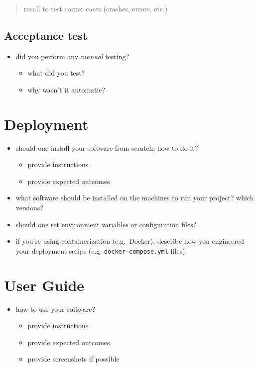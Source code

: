 \documentclass{scrartcl}
\begin{document}
\begin{quote}
recall to test corner cases (crashes, errors, etc.)
\end{quote}

\subsection{Acceptance test}\label{acceptance-test}

\begin{itemize}
  \item did you perform any \emph{manual} testing?
  \begin{itemize}
    \item what did you test?
    \item why wasn't it automatic?
  \end{itemize}
\end{itemize}

\section{Deployment}\label{deployment}

\begin{itemize}
  \item should one install your software from scratch, how to do it?
  \begin{itemize}
    \item provide instructions
    \item provide expected outcomes
  \end{itemize}

  \item what software should be installed on the machines to run your project? which versions?
  
  \item should one set environment variables or configuration files?
  
  \item if you're using containerization (e.g.~Docker), 
  describe how you engineered your deployment scrips (e.g. \texttt{docker-compose.yml} files)
\end{itemize}

\section{User Guide}\label{user-guide}

\begin{itemize}
  \item how to use your software?
  \begin{itemize}
    \item provide instructions
    \item provide expected outcomes
    \item provide screenshots if possible
  \end{itemize}
\end{itemize}
\end{document}
